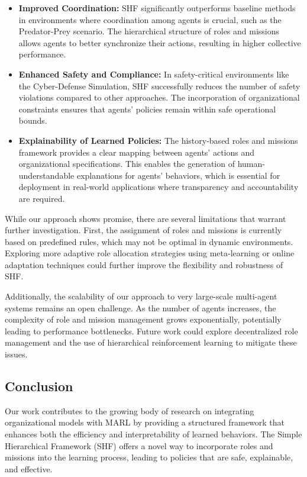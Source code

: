 \documentclass[sigconf,anonymous]{aamas}
\begin{document}
\begin{itemize}
    \item \textbf{Improved Coordination:} SHF significantly outperforms baseline methods in environments where coordination among agents is crucial, such as the Predator-Prey scenario. The hierarchical structure of roles and missions allows agents to better synchronize their actions, resulting in higher collective performance.
    \item \textbf{Enhanced Safety and Compliance:} In safety-critical environments like the Cyber-Defense Simulation, SHF successfully reduces the number of safety violations compared to other approaches. The incorporation of organizational constraints ensures that agents' policies remain within safe operational bounds.
    \item \textbf{Explainability of Learned Policies:} The history-based roles and missions framework provides a clear mapping between agents' actions and organizational specifications. This enables the generation of human-understandable explanations for agents' behaviors, which is essential for deployment in real-world applications where transparency and accountability are required.
\end{itemize}


While our approach shows promise, there are several limitations that warrant further investigation. First, the assignment of roles and missions is currently based on predefined rules, which may not be optimal in dynamic environments. Exploring more adaptive role allocation strategies using meta-learning or online adaptation techniques could further improve the flexibility and robustness of SHF.

Additionally, the scalability of our approach to very large-scale multi-agent systems remains an open challenge. As the number of agents increases, the complexity of role and mission management grows exponentially, potentially leading to performance bottlenecks. Future work could explore decentralized role management and the use of hierarchical reinforcement learning to mitigate these issues.


\subsection{Conclusion}
Our work contributes to the growing body of research on integrating organizational models with MARL by providing a structured framework that enhances both the efficiency and interpretability of learned behaviors. The Simple Hierarchical Framework (SHF) offers a novel way to incorporate roles and missions into the learning process, leading to policies that are safe, explainable, and effective.
\end{document}

